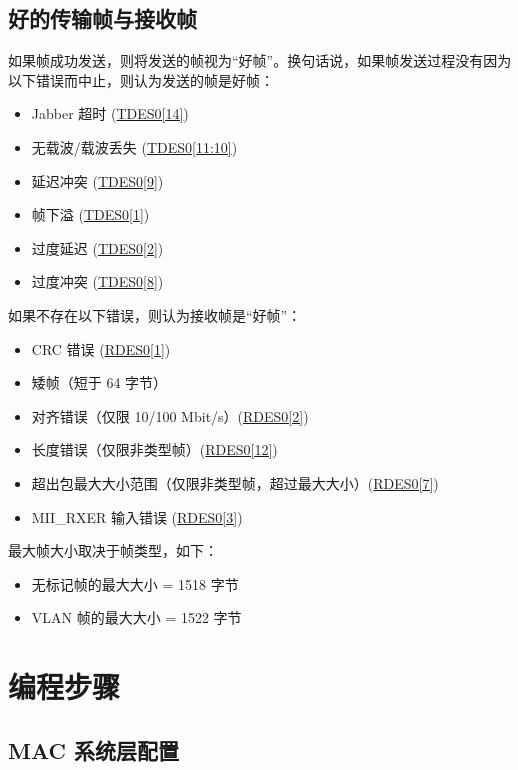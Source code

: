 \documentclass[main\_\_CN.tex]{subfiles}
\begin{document}
\subsection{好的传输帧与接收帧}
如果帧成功发送，则将发送的帧视为“好帧”。换句话说，如果帧发送过程没有因为以下错误而中止，则认为发送的帧是好帧：
\begin{itemize}
\item Jabber 超时 (\hyperref[tab:ethernetmac-TDES0]{TDES0[14]})
\item 无载波/载波丢失 (\hyperref[tab:ethernetmac-TDES0]{TDES0[11:10]})
\item 延迟冲突 (\hyperref[tab:ethernetmac-TDES0]{TDES0[9]})
\item 帧下溢 (\hyperref[tab:ethernetmac-TDES0]{TDES0[1]})
\item 过度延迟 (\hyperref[tab:ethernetmac-TDES0]{TDES0[2]})
\item 过度冲突 (\hyperref[tab:ethernetmac-TDES0]{TDES0[8]})
\end{itemize}
如果不存在以下错误，则认为接收帧是“好帧”：
\begin{itemize}
\item CRC 错误 (\hyperref[tab:ethernetmac-RDES0]{RDES0[1]})
\item 矮帧（短于 64 字节）
\item 对齐错误（仅限 10/100 Mbit/s）(\hyperref[tab:ethernetmac-RDES0]{RDES0[2]})
\item 长度错误（仅限非类型帧）(\hyperref[tab:ethernetmac-RDES0]{RDES0[12]})
\item 超出包最大大小范围（仅限非类型帧，超过最大大小）(\hyperref[tab:ethernetmac-RDES0]{RDES0[7]})
\item MII\_RXER 输入错误 (\hyperref[tab:ethernetmac-RDES0]{RDES0[3]})
\end{itemize}
最大帧大小取决于帧类型，如下：
\begin{itemize}
\item 无标记帧的最大大小 = 1518 字节
\item VLAN 帧的最大大小 = 1522 字节
\end{itemize}


\section{编程步骤}
\subsection{MAC 系统层配置}
\end{document}
